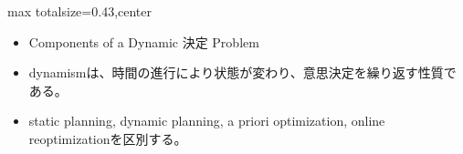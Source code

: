 \clearpage
{}
\begin{minipage}[t]{0.405\textwidth}
\begin{adjustbox}{max totalsize={\textwidth}{0.43\textheight},center}
\begin{minipage}{\textwidth}\scriptsize
{}\begin{itemize}
\item Components of a Dynamic 決定 Problem
\end{itemize}\begin{itemize}
\item dynamismは、時間の進行により状態が変わり、意思決定を繰り返す性質である。
\item static planning, dynamic planning, a priori optimization, online reoptimizationを区別する。
\end{itemize}
\end{minipage}
\end{adjustbox}
\end{minipage}\hfill
